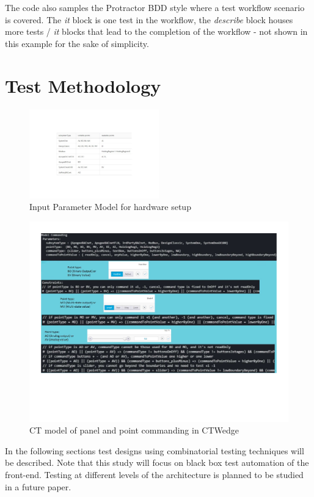 \documentclass[conference]{IEEEtran}
\begin{document}
	The code also samples the Protractor BDD style where a test workflow scenario is covered. 
	The \textit{it} block is one test in the workflow, the \textit{describe} block houses more tests / \textit{it} blocks that lead to the completion of the workflow - not shown in this example for the sake of simplicity.

\section{Test Methodology}
\begin{figure}[!b]
	\includegraphics[width=0.50\textwidth,]{commandingIPM.pdf}
	\caption{Input Parameter Model for hardware setup}
	\label{fig:commandingIPM}
\end{figure}

\begin{figure}[!t]
	\centering
		\includegraphics[width=1.00\textwidth,]{modelCommanding.pdf}
		\caption{CT model of panel and point commanding in CTWedge}
		\label{fig:modelCommanding}
\end{figure}
	
	In the following sections test designs using combinatorial testing techniques will be described. 
	Note that this study will focus on black box test automation of the front-end. Testing at different levels of the architecture is planned to be studied in a future paper.
\end{document}
